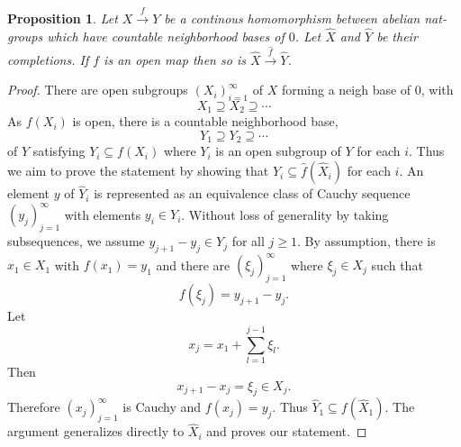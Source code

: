 \documentclass[8pt]{article}
\numberwithin{equation}{section}
\newtheorem{proposition}{Proposition}[subsection]
\begin{document}
\begin{proposition}
    \label{fact_20_2}
    Let $X\stackrel{f}{\to}Y$ be a continous homomorphism between abelian nat-groups which have countable neighborhood bases of $0$. Let $\widehat{X}$ and $\widehat{Y}$ be their completions. If $f$ is an open map then so is $\widehat{X}\stackrel{\widehat{f}}{\to}\widehat{Y}$.
\end{proposition}
\begin{proof}
    There are open subgroups $(X_i)_{i=1}^\infty$ of $X$ forming a neigh 
    base of $0$, with 
    \begin{equation*}
        X_1\supseteq X_2\supseteq\cdots
    \end{equation*}
    As $f(X_i)$ is open, there is a countable neighborhood base,
    \begin{equation*}
    Y_1\supseteq Y_2\supseteq\cdots 
    \end{equation*}
    of $Y$ satisfying $Y_i\subseteq f(X_i)$ where $Y_i$ is an open subgroup of $Y$ for each $i$. Thus we aim to prove the statement by showing %
    that $\widehat{Y}_i\subseteq \widehat{f}(\widehat{X}_i)$ for each $i$. An element $y$ of $\widehat{Y}_i$ is represented as an equivalence class of Cauchy sequence $(y_j)_{j=1}^\infty$ with elements $y_i\in Y_i$. Without loss of generality by taking subsequences, we assume $y_{j+1}-y_j\in Y_j$ %
    for all $j\geq 1$. By assumption, there is $x_1\in X_1$ with $f(x_1) = y_1$ and there are $(\xi_j)_{j=1}^\infty$ where $\xi_j\in X_{j}$ such that 
    \begin{equation*}
        f(\xi_j) = y_{j+1}-y_j.
    \end{equation*} 
    Let 
    \begin{equation*}
    x_j = x_1+\sum_{l=1}^{j-1}\xi_l.
    \end{equation*}
    Then 
    \begin{equation*}
        x_{j+1}-x_j = \xi_j\in X_j.%
    \end{equation*}
    Therefore $(x_j)_{j=1}^\infty$ is Cauchy and $f(x_j)=y_j$. Thus $\widehat{Y}_1\subseteq f(\widehat{X}_1)$. The argument generalizes directly to $\widehat{X}_i$ and proves our statement.%
\end{proof}
\end{document}
